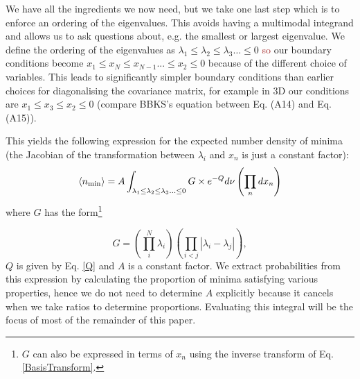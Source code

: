 \documentclass[12pt]{article}
\newcommand{\SH}[1]{\textcolor{brown}{[{\bf SH}: #1]}}
\newcommand{\sh}[1]{\textcolor{brown}{#1}}
\begin{document}


We have all the ingredients we now need, but we take one last step which is to enforce an ordering of the eigenvalues. This avoids having a multimodal integrand and allows us to ask questions about, e.g. the smallest or largest eigenvalue. We define the ordering of the eigenvalues as $\lambda_1 \leq \lambda_2 \leq \lambda_3 \ldots \leq 0$ \sh{so} our boundary conditions become $x_1\leq x_N\leq x_{N-1} ... \leq x_2 \leq 0$ because of the different choice of variables. This leads to significantly simpler boundary conditions than earlier choices for diagonalising the covariance matrix, for example in 3D our conditions are $x_1\leq x_3 \leq x_2 \leq 0$ (compare BBKS's equation between Eq. (A14) and Eq. (A15)).

This yields the following expression for the expected number density of minima (the Jacobian of the transformation between $\lambda_i$ and $x_n$ is just a constant factor):
%
\begin{equation} \label{DensityOfPeaks}
\langle n_{{\rm min}} \rangle = A \int_{\lambda_1 \leq \lambda_2 \leq \lambda_3 \ldots \leq 0} G \times e^{-Q} d\nu \left(\prod_n dx_n\right)
\end{equation}
%
\noindent where $G$ has the form\footnote{$G$ can also be expressed in terms of $x_n$ using the inverse transform of Eq. \ref{BasisTransform}.}

\begin{equation}
G = \left(\prod_{i}^{N} \lambda_i \right)\left(\prod_{i<j} |\lambda_i-\lambda_j|\right),
\end{equation} 
%
$Q$ is given by Eq. \ref{Q} and $A$ is a constant factor. We extract probabilities from this expression by calculating the proportion of minima satisfying various properties, hence we do not need to determine $A$ explicitly because it cancels when we take ratios to determine proportions. Evaluating this integral will be the focus of most of the remainder of this paper.
\end{document}
